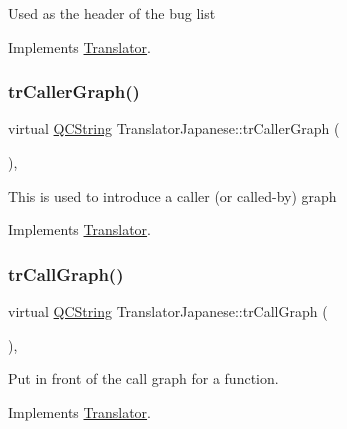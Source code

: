 Used as the header of the bug list 

Implements \mbox{\hyperlink{class_translator}{Translator}}.

\mbox{\label{class_translator_japanese_a954ec2b6811c3c9e02023be9ed7c0f15}} 
\subsubsection{\texorpdfstring{trCallerGraph()}{trCallerGraph()}}
{\footnotesize\ttfamily virtual \mbox{\hyperlink{class_q_c_string}{Q\+C\+String}} Translator\+Japanese\+::tr\+Caller\+Graph (\begin{DoxyParamCaption}{ }\end{DoxyParamCaption})\hspace{0.3cm}{\ttfamily [inline]}, {\ttfamily [virtual]}}

This is used to introduce a caller (or called-\/by) graph 

Implements \mbox{\hyperlink{class_translator}{Translator}}.

\mbox{\label{class_translator_japanese_ad7c66b02e985c4442a7f9df0add5dcfc}} 
\subsubsection{\texorpdfstring{trCallGraph()}{trCallGraph()}}
{\footnotesize\ttfamily virtual \mbox{\hyperlink{class_q_c_string}{Q\+C\+String}} Translator\+Japanese\+::tr\+Call\+Graph (\begin{DoxyParamCaption}{ }\end{DoxyParamCaption})\hspace{0.3cm}{\ttfamily [inline]}, {\ttfamily [virtual]}}

Put in front of the call graph for a function. 

Implements \mbox{\hyperlink{class_translator}{Translator}}.

\mbox{\label{class_translator_japanese_ad2d0fd23566c18aaefedc6f154072401}} 
